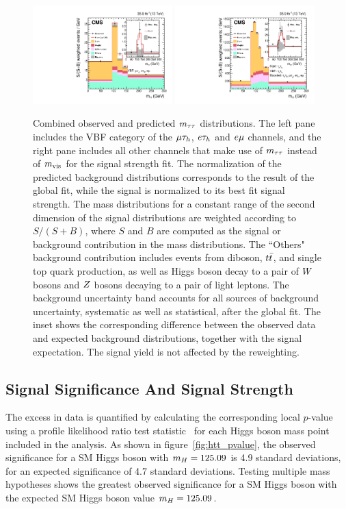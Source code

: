 \begin{figure}[htb]
  \centering
    \includegraphics[width=0.48\textwidth]{higgs_to_taus/plots/Figure_019-a.pdf}
    \includegraphics[width=0.48\textwidth]{higgs_to_taus/plots/Figure_019-b.pdf}
   \caption{Combined observed and predicted $m_{\tau\tau}$ distributions. The left pane includes the VBF category of the 
$\mu\tau_{h}$, $e\tau_{h}$ and $e\mu$ channels, and the right pane includes all other channels that make use 
of $m_{\tau\tau}$ instead of $m_\text{vis}$ for the signal strength fit. 
The normalization of the predicted background 
distributions corresponds to the result of the global fit, while the signal is normalized to its best fit 
signal strength. The mass distributions for a constant range of the second dimension of the signal distributions 
are weighted according to $S/(S+B)$, where $S$ and $B$ are computed as the signal or background 
contribution in the mass distributions. The ``Others" background contribution 
includes events from diboson, $t\bar{t}$, and single top quark production, as well as Higgs boson decay to a pair 
of $W$ bosons and $Z$ bosons decaying to a pair of light leptons. The background uncertainty band accounts 
for all sources of background uncertainty, systematic as well as statistical, after the global fit. The inset 
shows the corresponding difference between the observed data and expected background distributions, together 
with the signal expectation. The signal yield is not affected by the reweighting.
}
\label{fig:htt_massweighted}
\end{figure}


\subsection{Signal Significance And Signal Strength}
The excess in data is quantified by calculating the corresponding local $p$-value using a profile likelihood 
ratio test statistic~\cite{LHC-HCG-Report,Chatrchyan:2012tx,Junk,Read:2002hq} for each Higgs boson mass
point included in the analysis.
As shown in figure~\ref{fig:htt_pvalue}, the observed significance for a SM Higgs boson with $m_{H} = 125.09$\GeV 
is 4.9 standard deviations, for an expected significance of 4.7 standard deviations. Testing multiple mass hypotheses
shows the greatest observed significance for a SM Higgs boson with the expected SM Higgs boson value
$m_{H} = 125.09$\GeV.


